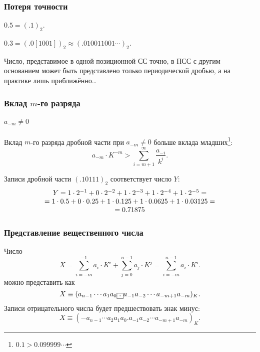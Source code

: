 \begin{frame}
    \frametitle{Потеря точности}
    
    \begin{example}
        $0.5 = (.1)_2$.
        
        $0.3 = (.0[1001])_2 \approx (.010011001\cdots)_2$.
    \end{example}
    
    Число, представимое в одной позиционной СС точно, в ПСС с другим основанием может быть представлено только периодической дробью, а на практике лишь приближённо\ldots
\end{frame}


\begin{frame}
    \frametitle{Вклад $m$-го разряда}
    \framesubtitle{$a_{-m}\neq 0$}
    
    Вклад $m$-го разряда дробной части при $a_{-m}\neq 0$ больше вклада младших\footnote{$0.1>0.099999\cdots$}:
    \[
        a_{-m}\cdot K^{-m}>\sum_{i=m+1}^{\infty}\frac{a_{-i}}{k^i}.
    \]
\end{frame}

\begin{frame}
    \begin{example}
        Записи дробной части $(.10111)_{2}$  соответствует число $Y$:
        \[
            \begin{array}[c]{c}
                Y=
                1\cdot 2^{-1}+
                0\cdot 2^{-2}+
                1\cdot 2^{-3}+
                1\cdot 2^{-4}+
                1\cdot 2^{-5} = \\
                =
                1\cdot 0.5+
                0\cdot 0.25+
                1\cdot 0.125+
                1\cdot 0.0625+
                1\cdot 0.03125 = \\
                = 0.71875
            \end{array}
        \]
    \end{example}
\end{frame}

\begin{frame}
    \frametitle{Представление вещественного числа}
    
    Число
    \[
        X=
        \sum_{i=-m}^{-1}a_i\cdot K^{i} + \sum_{j=0}^{n-1}a_j\cdot K^{j}=
        \sum_{i=-m}^{n-1}a_i\cdot K^{i}.
    \]
    можно представить как
    \[
        X\equiv(a_{n-1}\cdots a_{1}a_{0}\fbox{.}a_{-1}a_{-2}\cdots a_{-m+1}a_{-m})_K.
    \]
    Записи отрицательного числа будет предшествовать знак минус:
    \[
        X\equiv(-a_{n-1}\cdots a_{2}a_{1}a_{0}.a_{-1}a_{-2}\cdots a_{-m+1}a_{-m})_K.
    \]
\end{frame}

